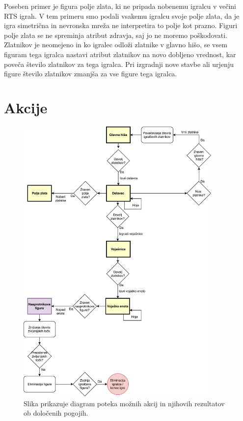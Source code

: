 \documentclass[a4paper, 12pt]{book}
\begin{document}
Poseben primer je figura polje zlata, ki ne pripada nobenemu igralcu v večini RTS igrah. 
V tem primeru smo podali vsakemu igralcu svoje polje zlata, da je igra simetrična in nevronska mreža ne interpretira to polje kot prazno.
Figuri polje zlata se ne spreminja atribut zdravja, saj jo ne moremo poškodovati. 
Zlatnikov je neomejeno in ko igralec odloži zlatnike v glavno hišo, se vsem figuram tega igralca nastavi atribut zlatnikov na novo dobljeno vrednost, kar poveča število zlatnikov za tega igralca. 
Pri izgradnji nove stavbe ali urjenju figure število zlatnikov zmanjša za vse figure tega igralca.

\section{Akcije}

\begin{figure}[h!]
	\begin{center}
		\includegraphics[width=0.9\textwidth]{photos/prikazAkcij.pdf}
	\end{center}
	\caption{Slika prikazuje diagram poteka možnih akcij in njihovih rezultatov ob določenih pogojih.}
	\label{picActions}
\end{figure}
\end{document}
